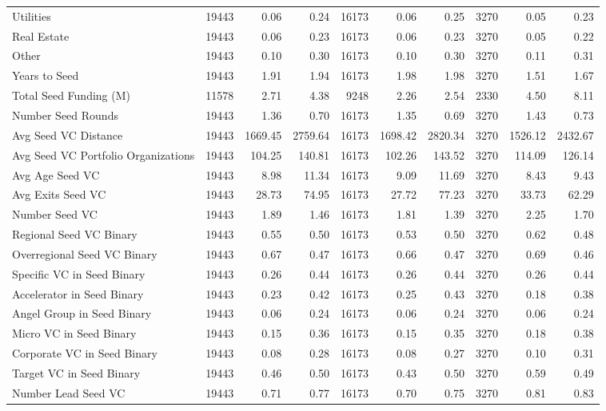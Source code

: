 \begin{table}[!h]
{\begin{tabular}[t]{lrrrrrrrrr}
Utilities & 19443 & 0.06 & 0.24 & 16173 & 0.06 & 0.25 & 3270 & 0.05 & 0.23\\
Real Estate & 19443 & 0.06 & 0.23 & 16173 & 0.06 & 0.23 & 3270 & 0.05 & 0.22\\
Other & 19443 & 0.10 & 0.30 & 16173 & 0.10 & 0.30 & 3270 & 0.11 & 0.31\\
Years to Seed & 19443 & 1.91 & 1.94 & 16173 & 1.98 & 1.98 & 3270 & 1.51 & 1.67\\
\addlinespace
Total Seed Funding (M) & 11578 & 2.71 & 4.38 & 9248 & 2.26 & 2.54 & 2330 & 4.50 & 8.11\\
Number Seed Rounds & 19443 & 1.36 & 0.70 & 16173 & 1.35 & 0.69 & 3270 & 1.43 & 0.73\\
Avg Seed VC Distance & 19443 & 1669.45 & 2759.64 & 16173 & 1698.42 & 2820.34 & 3270 & 1526.12 & 2432.67\\
Avg Seed VC Portfolio Organizations & 19443 & 104.25 & 140.81 & 16173 & 102.26 & 143.52 & 3270 & 114.09 & 126.14\\
Avg Age Seed VC & 19443 & 8.98 & 11.34 & 16173 & 9.09 & 11.69 & 3270 & 8.43 & 9.43\\
\addlinespace
Avg Exits Seed VC & 19443 & 28.73 & 74.95 & 16173 & 27.72 & 77.23 & 3270 & 33.73 & 62.29\\
Number Seed VC & 19443 & 1.89 & 1.46 & 16173 & 1.81 & 1.39 & 3270 & 2.25 & 1.70\\
Regional Seed VC Binary & 19443 & 0.55 & 0.50 & 16173 & 0.53 & 0.50 & 3270 & 0.62 & 0.48\\
Overregional Seed VC Binary & 19443 & 0.67 & 0.47 & 16173 & 0.66 & 0.47 & 3270 & 0.69 & 0.46\\
Specific VC in Seed Binary & 19443 & 0.26 & 0.44 & 16173 & 0.26 & 0.44 & 3270 & 0.26 & 0.44\\
\addlinespace
Accelerator in Seed Binary & 19443 & 0.23 & 0.42 & 16173 & 0.25 & 0.43 & 3270 & 0.18 & 0.38\\
Angel Group in Seed Binary & 19443 & 0.06 & 0.24 & 16173 & 0.06 & 0.24 & 3270 & 0.06 & 0.24\\
Micro VC in Seed Binary & 19443 & 0.15 & 0.36 & 16173 & 0.15 & 0.35 & 3270 & 0.18 & 0.38\\
Corporate VC in Seed Binary & 19443 & 0.08 & 0.28 & 16173 & 0.08 & 0.27 & 3270 & 0.10 & 0.31\\
Target VC in Seed Binary & 19443 & 0.46 & 0.50 & 16173 & 0.43 & 0.50 & 3270 & 0.59 & 0.49\\
\addlinespace
Number Lead Seed VC & 19443 & 0.71 & 0.77 & 16173 & 0.70 & 0.75 & 3270 & 0.81 & 0.83\\

\end{tabular}}
\end{table}
